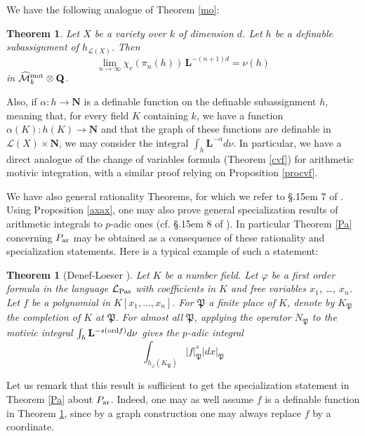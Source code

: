 \documentclass[english,12pt]{amsart}
\let\got\mathfrak
\def\gP{{\got P}}
\def\LL{{\mathbf L}}
\def\NN{{\mathbf N}}
\def\QQ{{\mathbf Q}}
\def\cL{{\mathcal L}}
\def\cM{{\mathcal M}}
\newtheorem{theorem}[subsubsection]{Theorem}
\theoremstyle{definition}
\theoremstyle{remark}
\theoremstyle{plain}
\numberwithin{equation}{subsection}
\let\got\mathfrak
\def\LL{{\mathbf L}}
\def\NN{{\mathbf N}}
\def\QQ{{\mathbf Q}}
\def\cL{{\mathcal L}}
\def\cM{{\mathcal M}}
\def\ord{{\rm ord}}
\begin{document}
We have the following analogue of Theorem \ref{mo}:
\begin{theorem}Let $X$ be a variety over $k$ of dimension $d$.
Let  $h$ be a definable subassignment of $h_{\cL (X)}$. Then 
$$
\lim_{n \rightarrow \infty}
\chi_{c} (\pi_{n} (h)) \, \LL^{-(n +
1) d}
= 
\nu (h)
$$ in
$\widehat \cM^{\rm mot}_k \otimes \QQ$.
\end{theorem}

Also, if $\alpha : h \rightarrow \NN$ is a definable function
on the definable subassignment $h$, meaning
that, for every field
$K$ containing $k$, we have a function $\alpha (K)  : h (K) \rightarrow \NN$
and that the graph of these functions are definable in $\cL (X) \times \NN$,
we may consider the  integral
$\int_h \LL^{- \alpha} d \nu$.
In particular,
we have a direct analogue of
the change of variables formula (Theorem \ref{cvf})
for arithmetic motivic integration,
with a similar proof relying on Proposition \ref{procvf}.


We have also general rationality Theorems, for which we refer to
\S\kern .15em 7 of \cite{def}. 
Using Proposition \ref{axax}, one may also prove general specialization results
of arithmetic integrals to $p$-adic ones (cf. \S\kern .15em 8 of \cite{def}).
In particular Theorem \ref{Pa} concerning $P_{\rm ar}$
may be obtained as a consequence of these rationality and specialization
statements.
Here is a typical example of such a statement:

\begin{theorem}[Denef-Loeser \cite{def}]\label{int}
Let $K$ be a number field. Let $\varphi$ be
a first order formula in the language
$\cL_{\rm Pas}$  with coefficients
in $K$ and free variables 
$x_1$, \dots, $x_n$. Let $f$ be a polynomial
in $K [x_1, \dots, x_n]$.
For 
$\got P$ a finite place of $K$, denote by 
$K_{\got P}$ the completion of $K$
at $\got P$. For almost all  $\got P$, 
applying the operator $N_{\gP}$  to the motivic integral $\int_h \LL^{- s (\ord f)} d \nu$
gives the $p$-adic integral
$$
\int_{h_{\varphi} (K_{\got P})} |f|_{\got P}^s |d x|_{\got P}
$$
\end{theorem}


Let us remark that this result is sufficient
to get the specialization statement in Theorem \ref{Pa} about $P_{\rm ar}$.
Indeed,
one may as well assume $f$ is a definable function in Theorem \ref{int},
since by a graph construction one may always replace $f$ by a coordinate.
\end{document}
